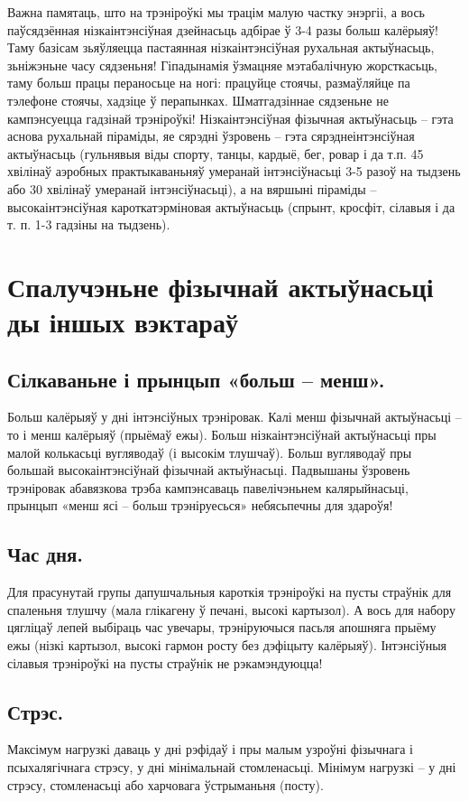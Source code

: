 Важна памятаць, што на трэніроўкі мы трацім малую частку энэргіі, а вось паўсядзённая нізкаінтэнсіўная дзейнасьць адбірае ў 3-4 разы больш калёрыяў! Таму базісам зьяўляецца пастаянная нізкаінтэнсіўная рухальная актыўнасьць, зьніжэньне часу сядзеньня! Гіпадынамія ўзмацняе мэтабалічную жорсткасьць, таму больш працы пераносьце на ногі: працуйце стоячы, размаўляйце па тэлефоне стоячы, хадзіце ў перапынках. Шматгадзіннае сядзеньне не кампэнсуецца гадзінай трэніроўкі! Нізкаінтэнсіўная фізычная актыўнасьць – гэта аснова рухальнай піраміды, яе сярэдні ўзровень – гэта сярэднеінтэнсіўная актыўнасьць (гульнявыя віды спорту, танцы, кардыё, бег, ровар і да т.п. 45 хвілінаў аэробных практыкаваньняў умеранай інтэнсіўнасьці 3-5 разоў на тыдзень або 30 хвілінаў умеранай інтэнсіўнасьці), а на вяршыні піраміды – высокаінтэнсіўная кароткатэрміновая актыўнасьць (спрынт, кросфіт, сілавыя і да т. п. 1-3 гадзіны на тыдзень).

\section{Спалучэньне фізычнай актыўнасьці ды іншых вэктараў}

\subsection{Сілкаваньне і прынцып «больш – менш».}
Больш калёрыяў у дні інтэнсіўных трэніровак. Калі менш фізычнай актыўнасьці – то і менш калёрыяў (прыёмаў ежы). Больш нізкаінтэнсіўнай актыўнасьці пры малой колькасьці вугляводаў (і высокім тлушчаў). Больш вугляводаў пры большай высокаінтэнсіўнай фізычнай актыўнасьці. Падвышаны ўзровень трэніровак абавязкова трэба кампэнсаваць павелічэньнем калярыйнасьці, прынцып «менш ясі – больш трэніруесься» небясьпечны для здароўя!

\subsection{Час дня.}
Для прасунутай групы дапушчальныя кароткія трэніроўкі на пусты страўнік для спаленьня тлушчу (мала глікагену ў печані, высокі картызол). А вось для набору цягліцаў лепей выбіраць час увечары, трэніруючыся пасьля апошняга прыёму ежы (нізкі картызол, высокі гармон росту без дэфіцыту калёрыяў). Інтэнсіўныя сілавыя трэніроўкі на пусты страўнік не рэкамэндуюцца!

\subsection{Стрэс.}
Максімум нагрузкі даваць у дні рэфідаў і пры малым узроўні фізычнага і псыхалягічнага стрэсу, у дні мінімальнай стомленасьці. Мінімум нагрузкі – у дні стрэсу, стомленасьці або харчовага ўстрыманьня (посту).

